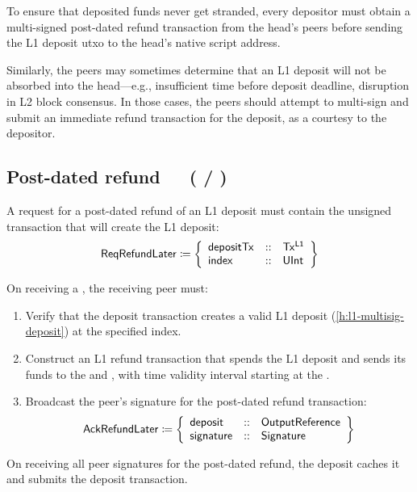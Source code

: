 \documentclass[../hydrozoa.tex]{subfiles}
\begin{document}
To ensure that deposited funds never get stranded, every depositor must obtain a multi-signed post-dated refund transaction from the head's peers before sending the L1 deposit utxo to the head's native script address.

Similarly, the peers may sometimes determine that an L1 deposit will not be absorbed into the head---e.g., insufficient time before deposit deadline, disruption in L2 block consensus.
In those cases, the peers should attempt to multi-sign and submit an immediate refund transaction for the deposit, as a courtesy to the depositor.

\subsection{Post-dated refund~~~( / )}%
\label{h:l2-consensus-post-dated-refund}%

A request for a post-dated refund of an L1 deposit must contain the unsigned transaction that will create the L1 deposit:
\begin{equation*}
  \mathsf{ReqRefundLater} \coloneq \left\{
  \begin{array}{lll}
    \mathsf{depositTx} &::& \mathsf{Tx^{L1}} \\
    \mathsf{index} &::& \mathsf{UInt}
  \end{array}\right\}
\end{equation*}

On receiving a , the receiving peer must:
\begin{enumerate}
  \item Verify that the deposit transaction creates a valid L1 deposit (\cref{h:l1-multisig-deposit}) at the specified index.
  \item Construct an L1 refund transaction that spends the L1 deposit and sends its funds to the  and , with time validity interval starting at the .
  \item Broadcast the peer's signature for the post-dated refund transaction:
    \begin{equation*}
      \mathsf{AckRefundLater} \coloneq \left\{
      \begin{array}{lll}
        \mathsf{deposit} &::& \mathsf{OutputReference} \\
        \mathsf{signature} &::& \mathsf{Signature}
      \end{array}\right\}
    \end{equation*}
\end{enumerate}
On receiving all peer signatures for the post-dated refund, the deposit caches it and submits the deposit transaction.
\end{document}

